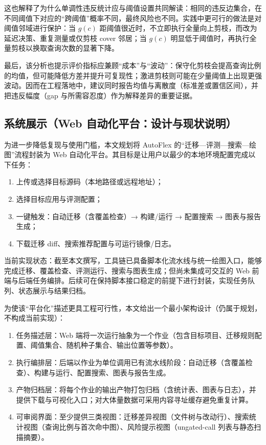 \documentclass[UTF8,a4paper,12pt,twoside]{ctexart}  %
\begin{document}
这也解释了为什么单调性违反统计应与阈值设置共同解读：相同的违反边集合，在不同阈值下对应的``跨阈值''概率不同，最终风险也不同。实践中更可行的做法是对阈值邻域进行保护：当
\(g(c)\)
距阈值很近时，不立即执行全量向上剪枝，而改为延迟决策、重复测量或仅剪枝
cover 邻居；当 \(g(c)\)
明显低于阈值时，再执行全量剪枝以换取查询次数的显著下降。

最后，该分析也提示评价指标应兼顾``成本''与``波动''：保守化剪枝会提高查询比例的均值，但可能降低方差并提升可复现性；激进剪枝则可能在少量阈值上出现更强波动。因而在工程落地中，建议同时报告均值与离散度（标准差或置信区间），并把违反幅度（gap
与所需容忍度）作为解释差异的重要证据。

\subsection{系统展示（Web
自动化平台：设计与现状说明）}

为进一步降低复现与使用门槛，本文规划将 AutoFlex
的``迁移---评测---搜索---绘图''流程封装为 Web
自动化平台。其目标是让用户以最少的本地环境配置完成以下任务：
\begin{enumerate}
\def\labelenumi{\arabic{enumi}.}
\item
  上传或选择目标源码（本地路径或远程地址）；
\item
  选择目标应用与评测配置；
\item
  一键触发：自动迁移（含覆盖检查）→ 构建/运行 → 配置搜索 →
  图表与报告生成；
\item
  下载迁移 diff、搜索推荐配置与可运行镜像/日志。
\end{enumerate}

当前实现状态：截至本文撰写，工具链已具备脚本化流水线与统一绘图入口，能够完成迁移、覆盖检查、评测运行、搜索与图表生成；但尚未集成可交互的
Web
前端与后端任务编排。后续可在保持脚本接口稳定的前提下进行封装，实现任务队列、状态展示与结果归档。

为使该``平台化''描述更具工程可行性，本文给出一个最小架构设计（仍属于规划，不构成当前实现）：
\begin{enumerate}
\def\labelenumi{\arabic{enumi}.}
\item
  任务描述层：Web
  端将一次运行抽象为一个作业（包含目标项目、迁移规则配置、阈值集合、随机种子集合、输出位置等参数）。
\item
  执行编排层：后端以作业为单位调用已有流水线阶段：自动迁移（含覆盖检查）、构建与运行、配置搜索、图表与报告生成。
\item
  产物归档层：将每个作业的输出产物打包归档（含统计表、图表与日志），并提供下载与可视化入口；对大体量数据可采用内容寻址缓存避免重复计算。
\item
  可审阅界面：至少提供三类视图：迁移差异视图（文件树与改动行）、搜索统计视图（查询比例与首次命中图）、风险提示视图（ungated-call
  列表与静态扫描摘要）。
\end{enumerate}
\end{document}
